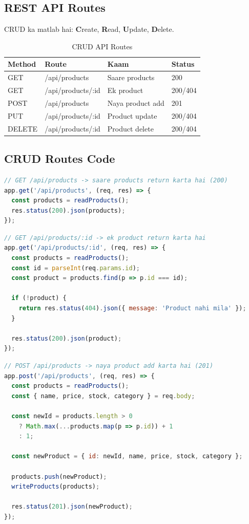 \documentclass[12pt,a4paper]{article}
\begin{document}
\subsection{REST API Routes}
CRUD ka matlab hai: \textbf{C}reate, \textbf{R}ead, \textbf{U}pdate, \textbf{D}elete.

\begin{table}[H]
\centering
\caption{CRUD API Routes}
\begin{tabular}{@{}llll@{}}
\toprule
\textbf{Method} & \textbf{Route} & \textbf{Kaam} & \textbf{Status} \\
\midrule
GET & /api/products & Saare products & 200 \\
GET & /api/products/:id & Ek product & 200/404 \\
POST & /api/products & Naya product add & 201 \\
PUT & /api/products/:id & Product update & 200/404 \\
DELETE & /api/products/:id & Product delete & 200/404 \\
\bottomrule
\end{tabular}
\end{table}

\subsection{CRUD Routes Code}

\begin{lstlisting}[language=JavaScript, caption={GET - Saare Products}]
// GET /api/products -> saare products return karta hai (200)
app.get('/api/products', (req, res) => {
  const products = readProducts();
  res.status(200).json(products);
});
\end{lstlisting}

\begin{lstlisting}[language=JavaScript, caption={GET - Ek Product by ID}]
// GET /api/products/:id -> ek product return karta hai
app.get('/api/products/:id', (req, res) => {
  const products = readProducts();
  const id = parseInt(req.params.id);
  const product = products.find(p => p.id === id);

  if (!product) {
    return res.status(404).json({ message: 'Product nahi mila' });
  }

  res.status(200).json(product);
});
\end{lstlisting}

\begin{lstlisting}[language=JavaScript, caption={POST - Naya Product Add}]
// POST /api/products -> naya product add karta hai (201)
app.post('/api/products', (req, res) => {
  const products = readProducts();
  const { name, price, stock, category } = req.body;

  const newId = products.length > 0 
    ? Math.max(...products.map(p => p.id)) + 1 
    : 1;

  const newProduct = { id: newId, name, price, stock, category };

  products.push(newProduct);
  writeProducts(products);

  res.status(201).json(newProduct);
});
\end{lstlisting}
\end{document}
